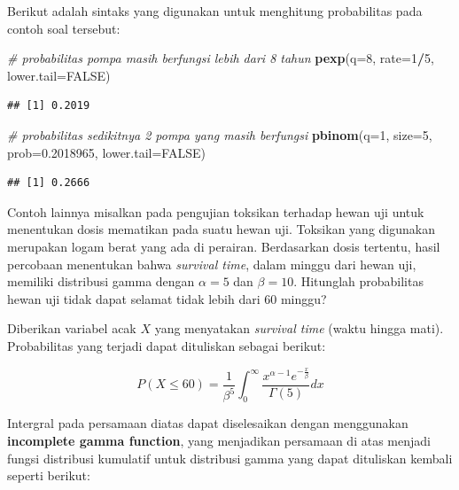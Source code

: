 \documentclass[]{book}
\newenvironment{Shaded}{\begin{snugshade}}{\end{snugshade}}
\newcommand{\KeywordTok}[1]{\textcolor[rgb]{0.13,0.29,0.53}{\textbf{#1}}}
\newcommand{\DataTypeTok}[1]{\textcolor[rgb]{0.13,0.29,0.53}{#1}}
\newcommand{\DecValTok}[1]{\textcolor[rgb]{0.00,0.00,0.81}{#1}}
\newcommand{\FloatTok}[1]{\textcolor[rgb]{0.00,0.00,0.81}{#1}}
\newcommand{\CommentTok}[1]{\textcolor[rgb]{0.56,0.35,0.01}{\textit{#1}}}
\newcommand{\OtherTok}[1]{\textcolor[rgb]{0.56,0.35,0.01}{#1}}
\newcommand{\OperatorTok}[1]{\textcolor[rgb]{0.81,0.36,0.00}{\textbf{#1}}}
\newcommand{\NormalTok}[1]{#1}
\begin{document}
Berikut adalah sintaks yang digunakan untuk menghitung probabilitas pada
contoh soal tersebut:

\begin{Shaded}
\begin{Highlighting}[]
\CommentTok{# probabilitas pompa masih berfungsi lebih dari 8 tahun}
\KeywordTok{pexp}\NormalTok{(}\DataTypeTok{q=}\DecValTok{8}\NormalTok{, }\DataTypeTok{rate=}\DecValTok{1}\OperatorTok{/}\DecValTok{5}\NormalTok{, }\DataTypeTok{lower.tail=}\OtherTok{FALSE}\NormalTok{)}
\end{Highlighting}
\end{Shaded}

\begin{verbatim}
## [1] 0.2019
\end{verbatim}

\begin{Shaded}
\begin{Highlighting}[]
\CommentTok{# probabilitas sedikitnya 2 pompa yang masih berfungsi}
\KeywordTok{pbinom}\NormalTok{(}\DataTypeTok{q=}\DecValTok{1}\NormalTok{, }\DataTypeTok{size=}\DecValTok{5}\NormalTok{, }\DataTypeTok{prob=}\FloatTok{0.2018965}\NormalTok{, }\DataTypeTok{lower.tail=}\OtherTok{FALSE}\NormalTok{)}
\end{Highlighting}
\end{Shaded}

\begin{verbatim}
## [1] 0.2666
\end{verbatim}

Contoh lainnya misalkan pada pengujian toksikan terhadap hewan uji untuk
menentukan dosis mematikan pada suatu hewan uji. Toksikan yang digunakan
merupakan logam berat yang ada di perairan. Berdasarkan dosis tertentu,
hasil percobaan menentukan bahwa \emph{survival time}, dalam minggu dari
hewan uji, memiliki distribusi gamma dengan \(\alpha=5\) dan
\(\beta=10\). Hitunglah probabilitas hewan uji tidak dapat selamat tidak
lebih dari 60 minggu?

Diberikan variabel acak \(X\) yang menyatakan \emph{survival time}
(waktu hingga mati). Probabilitas yang terjadi dapat dituliskan sebagai
berikut:

\[
P\left(X\le60\right)=\frac{1}{\beta^5}\int_0^{\infty}\frac{x^{\alpha-1}e^{-\frac{x}{\beta}}}{\Gamma\left(5\right)}dx
\]

Intergral pada persamaan diatas dapat diselesaikan dengan menggunakan
\textbf{incomplete gamma function}, yang menjadikan persamaan di atas
menjadi fungsi distribusi kumulatif untuk distribusi gamma yang dapat
dituliskan kembali seperti berikut:
\end{document}
